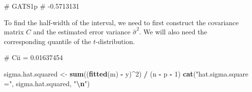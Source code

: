 \documentclass[
  a4paper,
]{article}
\newenvironment{Shaded}{\begin{snugshade}}{\end{snugshade}}
\newcommand{\DecValTok}[1]{\textcolor[rgb]{0.00,0.00,0.81}{#1}}
\newcommand{\FunctionTok}[1]{\textcolor[rgb]{0.13,0.29,0.53}{\textbf{#1}}}
\newcommand{\NormalTok}[1]{#1}
\newcommand{\OtherTok}[1]{\textcolor[rgb]{0.56,0.35,0.01}{#1}}
\newcommand{\SpecialCharTok}[1]{\textcolor[rgb]{0.81,0.36,0.00}{\textbf{#1}}}
\newcommand{\StringTok}[1]{\textcolor[rgb]{0.31,0.60,0.02}{#1}}
\theoremstyle{definition}
\theoremstyle{definition}
\theoremstyle{definition}
\theoremstyle{definition}
\theoremstyle{remark}
\begin{document}
\begin{Shaded}
\begin{Highlighting}[]
\NormalTok{\#     GATS1p }
\NormalTok{\# {-}0.5713131}
\end{Highlighting}
\end{Shaded}

To find the half-width of the interval, we need to first construct the
covariance matrix \(C\) and the estimated error variance \(\hat\sigma^2\).
We will also need the corresponding quantile of the \(t\)-distribution.

\begin{Shaded}
\end{Shaded}

\begin{Shaded}
\begin{Highlighting}[]
\NormalTok{\# Cii = 0.01637454}
\end{Highlighting}
\end{Shaded}

\begin{Shaded}
\begin{Highlighting}[]
\NormalTok{sigma.hat.squared }\OtherTok{\textless{}{-}} \FunctionTok{sum}\NormalTok{((}\FunctionTok{fitted}\NormalTok{(m) }\SpecialCharTok{{-}}\NormalTok{ y)}\SpecialCharTok{\^{}}\DecValTok{2}\NormalTok{) }\SpecialCharTok{/}\NormalTok{ (n }\SpecialCharTok{{-}}\NormalTok{ p }\SpecialCharTok{{-}} \DecValTok{1}\NormalTok{)}
\FunctionTok{cat}\NormalTok{(}\StringTok{"hat.sigma.square ="}\NormalTok{, sigma.hat.squared, }\StringTok{"}\SpecialCharTok{\textbackslash{}n}\StringTok{"}\NormalTok{)}
\end{Highlighting}
\end{Shaded}
\end{document}
